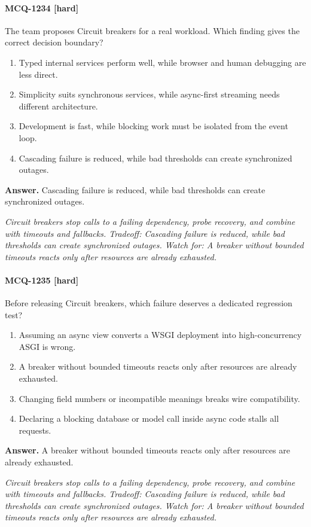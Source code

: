 \paragraph{MCQ-1234 [hard]} The team proposes Circuit breakers for a real workload. Which finding gives the correct decision boundary?
\begin{enumerate}[label=\Alph*.]
\item Typed internal services perform well, while browser and human debugging are less direct.
\item Simplicity suits synchronous services, while async-first streaming needs different architecture.
\item Development is fast, while blocking work must be isolated from the event loop.
\item Cascading failure is reduced, while bad thresholds can create synchronized outages.
\end{enumerate}
\noindent\textbf{Answer.} Cascading failure is reduced, while bad thresholds can create synchronized outages.
\par\textit{Circuit breakers stop calls to a failing dependency, probe recovery, and combine with timeouts and fallbacks. Tradeoff: Cascading failure is reduced, while bad thresholds can create synchronized outages. Watch for: A breaker without bounded timeouts reacts only after resources are already exhausted.}
\paragraph{MCQ-1235 [hard]} Before releasing Circuit breakers, which failure deserves a dedicated regression test?
\begin{enumerate}[label=\Alph*.]
\item Assuming an async view converts a WSGI deployment into high-concurrency ASGI is wrong.
\item A breaker without bounded timeouts reacts only after resources are already exhausted.
\item Changing field numbers or incompatible meanings breaks wire compatibility.
\item Declaring a blocking database or model call inside async code stalls all requests.
\end{enumerate}
\noindent\textbf{Answer.} A breaker without bounded timeouts reacts only after resources are already exhausted.
\par\textit{Circuit breakers stop calls to a failing dependency, probe recovery, and combine with timeouts and fallbacks. Tradeoff: Cascading failure is reduced, while bad thresholds can create synchronized outages. Watch for: A breaker without bounded timeouts reacts only after resources are already exhausted.}
